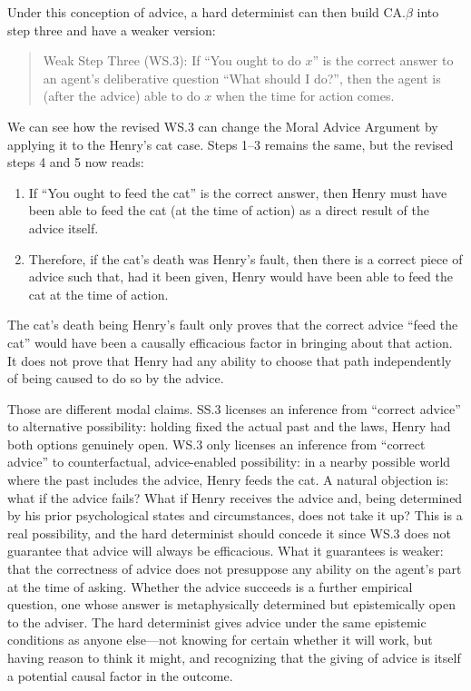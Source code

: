Under this conception of advice, a hard determinist can then build CA.$\beta$
into step three and have a weaker version:

\vspace{-1em}
\begin{quote}
Weak Step Three (WS.3): If ``You ought to do $x$'' is the correct answer
to an agent's deliberative question ``What should I do?'', then the
agent is (after the advice) able to do $x$ when the time for action comes.
\end{quote}

\noindent We can see how the revised WS.3 can change the Moral Advice Argument by
applying it to the Henry's cat case. Steps 1--3 remains the same, but the
revised steps 4 and 5 now reads:

\vspace{-1em}
\begin{enumerate}
\def\labelenumi{\arabic{enumi}.}
\setcounter{enumi}{3}
\item
If ``You ought to feed the cat'' is the correct answer, then Henry
must have been able to feed the cat (at the time of action) as a direct
result of the advice itself.

\item 
Therefore, if the cat's death was Henry's fault, then there is a
correct piece of advice such that, had it been given, Henry would have
been able to feed the cat at the time of action.
\end{enumerate}

\noindent The cat's death being Henry's fault only proves that the correct advice
``feed the cat'' would have been a causally efficacious factor in
bringing about that action. It does not prove that Henry had any ability
to choose that path independently of being caused to do so by the
advice.

Those are different modal claims. SS.3 licenses an inference from
``correct advice'' to alternative possibility: holding fixed the actual
past and the laws, Henry had both options genuinely open. WS.3 only
licenses an inference from ``correct advice'' to counterfactual,
advice-enabled possibility: in a nearby possible world where the past
includes the advice, Henry feeds the cat. A natural objection is: what
if the advice fails? What if Henry receives the advice and, being
determined by his prior psychological states and circumstances, does not
take it up? This is a real possibility, and the hard determinist should
concede it since WS.3 does not guarantee that advice will always be
efficacious. What it guarantees is weaker: that the correctness of
advice does not presuppose any ability on the agent's part at the time
of asking. Whether the advice succeeds is a further empirical question,
one whose answer is metaphysically determined but epistemically open to
the adviser. The hard determinist gives advice under the same epistemic
conditions as anyone else---not knowing for certain whether it will
work, but having reason to think it might, and recognizing that the
giving of advice is itself a potential causal factor in the outcome.

